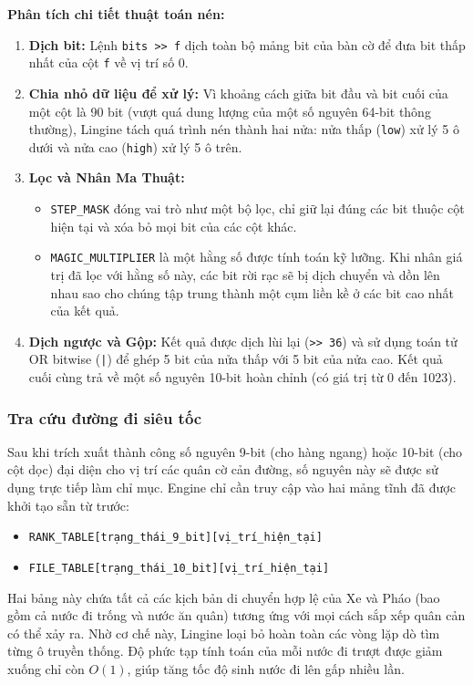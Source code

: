 \textbf{Phân tích chi tiết thuật toán nén:}
\begin{enumerate}
    \item \textbf{Dịch bit:} Lệnh \texttt{bits >> f} dịch toàn bộ mảng bit của bàn cờ để đưa bit thấp nhất của cột \texttt{f} về vị trí số 0.
    \item \textbf{Chia nhỏ dữ liệu để xử lý:} Vì khoảng cách giữa bit đầu và bit cuối của một cột là 90 bit (vượt quá dung lượng của một số nguyên 64-bit thông thường), Lingine tách quá trình nén thành hai nửa: nửa thấp (\texttt{low}) xử lý 5 ô dưới và nửa cao (\texttt{high}) xử lý 5 ô trên.
    \item \textbf{Lọc và Nhân Ma Thuật:}
    \begin{itemize}
        \item \texttt{STEP\_MASK} đóng vai trò như một bộ lọc, chỉ giữ lại đúng các bit thuộc cột hiện tại và xóa bỏ mọi bit của các cột khác.
        \item \texttt{MAGIC\_MULTIPLIER} là một hằng số được tính toán kỹ lưỡng. Khi nhân giá trị đã lọc với hằng số này, các bit rời rạc sẽ bị dịch chuyển và dồn lên nhau sao cho chúng tập trung thành một cụm liền kề ở các bit cao nhất của kết quả.
    \end{itemize}
    \item \textbf{Dịch ngược và Gộp:} Kết quả được dịch lùi lại (\texttt{>> 36}) và sử dụng toán tử OR bitwise (\texttt{|}) để ghép 5 bit của nửa thấp với 5 bit của nửa cao. Kết quả cuối cùng trả về một số nguyên 10-bit hoàn chỉnh (có giá trị từ 0 đến 1023).
\end{enumerate}

\subsubsection{Tra cứu đường đi siêu tốc}

Sau khi trích xuất thành công số nguyên 9-bit (cho hàng ngang) hoặc 10-bit (cho cột dọc) đại diện cho vị trí các quân cờ cản đường, số nguyên này sẽ được sử dụng trực tiếp làm chỉ mục. Engine chỉ cần truy cập vào hai mảng tĩnh đã được khởi tạo sẵn từ trước:
\begin{itemize}
    \item \texttt{RANK\_TABLE[trạng\_thái\_9\_bit][vị\_trí\_hiện\_tại]}
    \item \texttt{FILE\_TABLE[trạng\_thái\_10\_bit][vị\_trí\_hiện\_tại]}
\end{itemize}

Hai bảng này chứa tất cả các kịch bản di chuyển hợp lệ của Xe và Pháo (bao gồm cả nước đi trống và nước ăn quân) tương ứng với mọi cách sắp xếp quân cản có thể xảy ra. Nhờ cơ chế này, Lingine loại bỏ hoàn toàn các vòng lặp dò tìm từng ô truyền thống. Độ phức tạp tính toán của mỗi nước đi trượt được giảm xuống chỉ còn $O(1)$, giúp tăng tốc độ sinh nước đi lên gấp nhiều lần.

